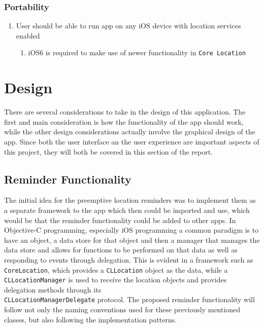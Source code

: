 \documentclass[12pt]{report}
\begin{document}
\subsection{Portability}

\begin{enumerate}[label*=\arabic*.]

\item{User should be able to run app on any iOS device with location services enabled}
     \begin{enumerate}[label*=\arabic*.]
        \item{iOS6 is required to make use of newer functionality in \texttt{Core Location}}
    \end{enumerate}
    
\end{enumerate}

\chapter{Design}

There are several considerations to take in the design of this application. The first and main consideration is how the functionality of the app should work, while the other design considerations actually involve the graphical design of the app. Since both the user interface an the user experience are important aspects of this project, they will both be covered in this section of the report.

\section{Reminder Functionality}

The initial idea for the preemptive location reminders was to implement them as a separate framework to the app which then could be imported and use, which would be that the reminder functionality could be added to other apps. In Objective-C programming, especially iOS programming a common paradigm is to have an object, a data store for that object and then a manager that manages the data store and allows for functions to be performed on that data as well as responding to events through delegation. This is evident in a framework such as \texttt{CoreLocation}, which provides a \texttt{CLLocation} object as the data, while a \texttt{CLLocationManager} is used to receive the location objects and provides delegation methods through its \\\texttt{CLLocationManagerDelegate} protocol. The proposed reminder functionality will follow not only the naming conventions used for these previously mentioned classes, but also following the implementation patterns.  
\end{document}
